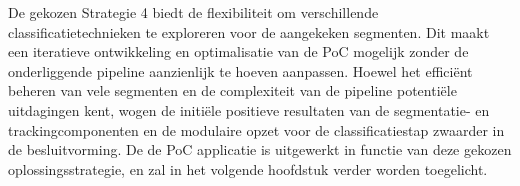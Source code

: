 De gekozen Strategie 4 biedt de flexibiliteit om verschillende classificatietechnieken te exploreren voor de aangekeken segmenten.
Dit maakt een iteratieve ontwikkeling en optimalisatie van de PoC mogelijk zonder de onderliggende pipeline aanzienlijk te hoeven aanpassen.
Hoewel het efficiënt beheren van vele segmenten en de complexiteit van de pipeline potentiële uitdagingen kent, 
wogen de initiële positieve resultaten van de segmentatie- en trackingcomponenten en de modulaire opzet voor de classificatiestap zwaarder in de besluitvorming.
De de PoC applicatie is uitgewerkt in functie van deze gekozen oplossingsstrategie, en zal in het volgende hoofdstuk verder worden toegelicht.